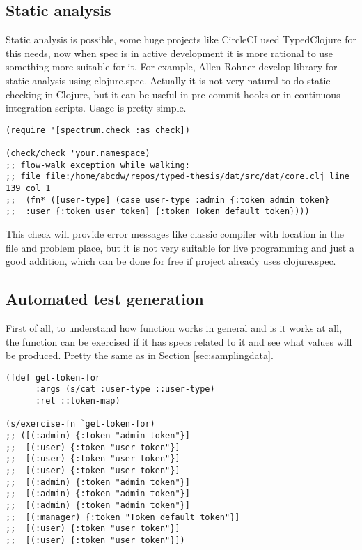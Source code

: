 \subsection{Static analysis}
Static analysis is possible, some huge projects like CircleCI used TypedClojure
for this needs, now when spec is in active development it is more rational to
use something more suitable for it. For example, Allen Rohner develop library
for static analysis using clojure.spec. Actually it is not very natural to do
static checking in Clojure, but it can be useful in pre-commit hooks or in
continuous integration scripts. Usage is pretty simple.

\begin{verbatim}
(require '[spectrum.check :as check])

(check/check 'your.namespace)
;; flow-walk exception while walking:
;; file file:/home/abcdw/repos/typed-thesis/dat/src/dat/core.clj line 139 col 1
;;  (fn* ([user-type] (case user-type :admin {:token admin token}
;;  :user {:token user token} {:token Token default token})))
\end{verbatim}

This check will provide error messages like classic compiler with location in
the file and problem place, but it is not very suitable for live programming and
just a good addition, which can be done for free if project already uses clojure.spec.

\subsection{Automated test generation}
First of all, to understand how function works in general and is it works at
all, the function can be exercised if it has specs related to it and see what
values will be produced. Pretty the same as in Section \ref{sec:samplingdata}.

\begin{verbatim}
(fdef get-token-for
      :args (s/cat :user-type ::user-type)
      :ret ::token-map)

(s/exercise-fn `get-token-for)
;; ([(:admin) {:token "admin token"}]
;;  [(:user) {:token "user token"}]
;;  [(:user) {:token "user token"}]
;;  [(:user) {:token "user token"}]
;;  [(:admin) {:token "admin token"}]
;;  [(:admin) {:token "admin token"}]
;;  [(:admin) {:token "admin token"}]
;;  [(:manager) {:token "Token default token"}]
;;  [(:user) {:token "user token"}]
;;  [(:user) {:token "user token"}])
\end{verbatim}

